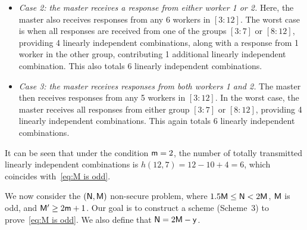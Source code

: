 \documentclass[conference,letterpaper]{IEEEtran}
\begin{document}
\begin{example}
\begin{itemize}
\item {\it Case 2: the master receives a response from either worker 1 or 2.} Here, the master also receives responses from any 6 workers in $[3:12]$. The worst case is when all responses are received from one of the groups $[3:7]$ or $[8:12]$, providing 4 linearly independent combinations, along with a response from 1 worker in the other group, contributing 1 additional linearly independent combination. This also totals 6 linearly independent combinations.

\item {\it Case 3: the master receives responses from both workers 1 and 2.} The master then receives responses from any 5 workers in $[3:12]$. In the worst case, the master receives all responses from either group $[3:7]$ or $[8:12]$, providing 4 linearly independent combinations. This again totals 6 linearly independent combinations.
\end{itemize}
It can be seen that under the condition ${\sf m} = 2$, the number of totally transmitted linearly independent combinations is $h(12,7) = 12 - 10 + 4 = 6$, which coincides with~\eqref{eq:M is odd}.



\end{example}
We now consider the $({\sf N}, {\sf M})$ non-secure problem, where $1.5 {\sf M} \leq {\sf N} < 2{\sf M}$, ${\sf M}$ is odd, and ${\sf M}^{\prime} \geq 2{\sf m} + 1$. Our goal is to construct a scheme (Scheme~3) to prove~\eqref{eq:M is odd}.
We also define that ${\sf N}=2{\sf M}-{\sf y}$. 
\end{document}
